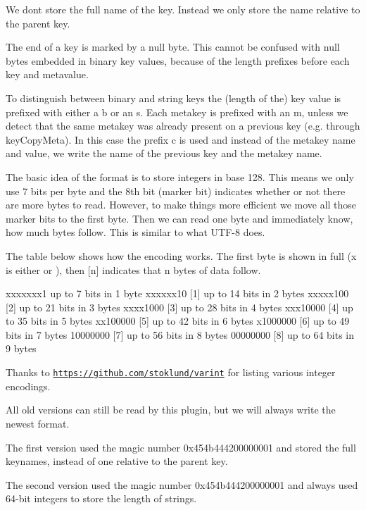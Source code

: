 We don\textquotesingle{}t store the full name of the key. Instead we only store the name relative to the parent key.

The end of a key is marked by a null byte. This cannot be confused with null bytes embedded in binary key values, because of the length prefixes before each key and metavalue.

To distinguish between binary and string keys the (length of the) key value is prefixed with either a {\ttfamily b} or an {\ttfamily s}. Each metakey is prefixed with an {\ttfamily m}, unless we detect that the same metakey was already present on a previous key (e.\+g. through {\ttfamily key\+Copy\+Meta}). In this case the prefix {\ttfamily c} is used and instead of the metakey name and value, we write the name of the previous key and the metakey name.

The basic idea of the format is to store integers in base 128. This means we only use 7 bits per byte and the 8th bit (marker bit) indicates whether or not there are more bytes to read. However, to make things more efficient we move all those marker bits to the first byte. Then we can read one byte and immediately know, how much bytes follow. This is similar to what U\+T\+F-\/8 does.

The table below shows how the encoding works. The first byte is shown in full ({\ttfamily x} is either {} or {}), then {\ttfamily \mbox{[}n\mbox{]}} indicates that {\ttfamily n} bytes of data follow.


\begin{DoxyCode}
xxxxxxx1     up to  7 bits in 1 byte
xxxxxx10 [1] up to 14 bits in 2 bytes
xxxxx100 [2] up to 21 bits in 3 bytes
xxxx1000 [3] up to 28 bits in 4 bytes
xxx10000 [4] up to 35 bits in 5 bytes
xx100000 [5] up to 42 bits in 6 bytes
x1000000 [6] up to 49 bits in 7 bytes
10000000 [7] up to 56 bits in 8 bytes
00000000 [8] up to 64 bits in 9 bytes
\end{DoxyCode}


Thanks to \href{https://github.com/stoklund/varint}{\tt https\+://github.\+com/stoklund/varint} for listing various integer encodings.

All old versions can still be read by this plugin, but we will always write the newest format.

The first version used the magic number {\ttfamily 0x454b444200000001} and stored the full keynames, instead of one relative to the parent key.

The second version used the magic number {\ttfamily 0x454b444200000001} and always used 64-\/bit integers to store the length of strings.

